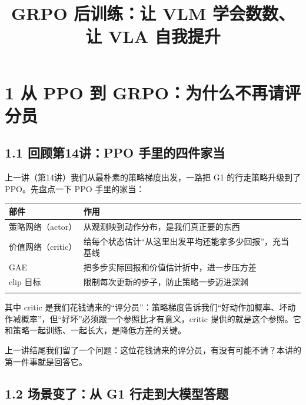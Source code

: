 \documentclass[
  chinese,
]{ctexart}
\title{GRPO 后训练：让 VLM 学会数数、让 VLA 自我提升}
\author{}
\date{}
\renewcommand*\contentsname{目录}
\newcommand\contentsname{目录}
\begin{document}
\maketitle

\renewcommand*\contentsname{目录}
{
\hypersetup{linkcolor=}
\setcounter{tocdepth}{3}
\tableofcontents
}

\section{1 从 PPO 到
GRPO：为什么不再请评分员}\label{ux4ece-ppo-ux5230-grpoux4e3aux4ec0ux4e48ux4e0dux518dux8bf7ux8bc4ux5206ux5458}

\subsection{1.1 回顾第14讲：PPO
手里的四件家当}\label{ux56deux987eux7b2c14ux8bb2ppo-ux624bux91ccux7684ux56dbux4ef6ux5bb6ux5f53}

上一讲（第14讲）我们从最朴素的策略梯度出发，一路把 G1 的行走策略升级到了
PPO。先盘点一下 PPO 手里的家当：

\begin{center}
\begin{tabular}{@{}>{\raggedright\arraybackslash}p{} >{\raggedright\arraybackslash}p{}@{}}
\toprule\noalign{}
部件 & 作用 \\
\midrule\noalign{}
策略网络（actor） & 从观测映到动作分布，是我们真正要的东西 \\
价值网络（critic） & 给每个状态估计``从这里出发平均还能拿多少回报''，充当基线 \\
GAE & 把多步实际回报和价值估计折中，进一步压方差 \\
clip 目标 & 限制每次更新的步子，防止策略一步迈进深渊 \\
\bottomrule\noalign{}
\end{tabular}
\end{center}

其中 critic
是我们花钱请来的``评分员''：策略梯度告诉我们``好动作加概率、坏动作减概率''，但``好坏''必须跟一个参照比才有意义，critic
提供的就是这个参照。它和策略一起训练、一起长大，是降低方差的关键。

上一讲结尾我们留了一个问题：这位花钱请来的评分员，有没有可能不请？本讲的第一件事就是回答它。

\subsection{1.2 场景变了：从 G1
行走到大模型答题}\label{ux573aux666fux53d8ux4e86ux4ece-g1-ux884cux8d70ux5230ux5927ux6a21ux578bux7b54ux9898}
\end{document}
